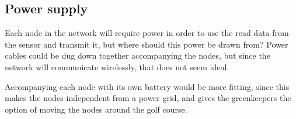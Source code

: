 \subsection{Power supply}

Each node in the network will require power in order to use the read data from the sensor and transmit it, but where should this power be drawn from? Power cables could be dug down together accompanying the nodes, but since the network will communicate wirelessly, that does not seem ideal.

Accompanying each node with its own battery would be more fitting, since this makes the nodes independent from a power grid, and gives the greenkeepers the option of moving the nodes around the golf course. 



%
%	
%
%
%
%
%	
%
